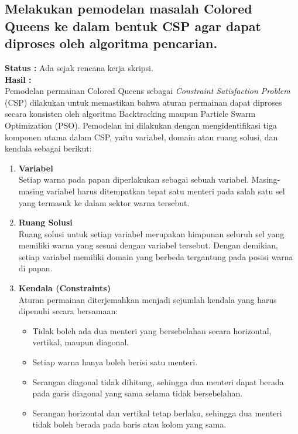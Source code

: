 \documentclass[a4paper,twoside]{article}
\begin{document}
	\subsection{Melakukan pemodelan masalah Colored Queens ke dalam bentuk CSP agar dapat diproses oleh algoritma pencarian.}
	{\bf Status :} Ada sejak rencana kerja skripsi.\\
	{\bf Hasil :}\\
	Pemodelan permainan Colored Queens sebagai \textit{Constraint Satisfaction Problem} (CSP) dilakukan untuk memastikan bahwa aturan permainan dapat diproses secara konsisten oleh algoritma Backtracking maupun Particle Swarm Optimization (PSO). Pemodelan ini dilakukan dengan mengidentifikasi tiga komponen utama dalam CSP, yaitu variabel, domain atau ruang solusi, dan kendala sebagai berikut:
	
	\begin{enumerate}
	\item \textbf{Variabel} \\
	Setiap warna pada papan diperlakukan sebagai sebuah variabel. Masing-masing variabel harus ditempatkan tepat satu menteri pada salah satu sel yang termasuk ke dalam sektor warna tersebut.
	
	\item \textbf{Ruang Solusi} \\
	Ruang solusi untuk setiap variabel merupakan himpunan seluruh sel yang memiliki warna yang sesuai dengan variabel tersebut. Dengan demikian, setiap variabel memiliki domain yang berbeda tergantung pada posisi warna di papan.
	
	\item \textbf{Kendala (Constraints)} \\
	Aturan permainan diterjemahkan menjadi sejumlah kendala yang harus dipenuhi secara bersamaan:
	\begin{itemize}
		\item Tidak boleh ada dua menteri yang bersebelahan secara horizontal, vertikal, maupun diagonal.
		\item Setiap warna hanya boleh berisi satu menteri.
		\item Serangan diagonal tidak dihitung, sehingga dua menteri dapat berada pada garis diagonal yang sama selama tidak bersebelahan.
		\item Serangan horizontal dan vertikal tetap berlaku, sehingga dua menteri tidak boleh berada pada baris atau kolom yang sama.
	\end{itemize}
	\end{enumerate}
	
\end{document}
